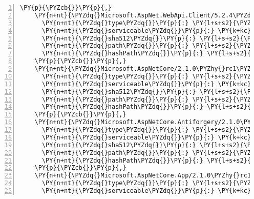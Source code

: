 \begin{Verbatim}[commandchars=\\\{\},numbers=left,firstnumber=1,stepnumber=1,numberblanklines=0]
    \PY{p}{\PYZcb{}}\PY{p}{,}
    \PY{n+nt}{\PYZdq{}Microsoft.AspNet.WebApi.Client/5.2.4\PYZdq{}}\PY{p}{:} \PY{p}{\PYZob{}}
      \PY{n+nt}{\PYZdq{}type\PYZdq{}}\PY{p}{:} \PY{l+s+s2}{\PYZdq{}package\PYZdq{}}\PY{p}{,}
      \PY{n+nt}{\PYZdq{}serviceable\PYZdq{}}\PY{p}{:} \PY{k+kc}{true}\PY{p}{,}
      \PY{n+nt}{\PYZdq{}sha512\PYZdq{}}\PY{p}{:} \PY{l+s+s2}{\PYZdq{}sha512\PYZhy{}OdBVC2bQWkf9qDd7Mt07ev4SwIdu6VmLBMTWC0D5cOP/HWSXyv/77otwtXVrAo42duNjvXOjzjP5oOI9m1+DTQ==\PYZdq{}}\PY{p}{,}
      \PY{n+nt}{\PYZdq{}path\PYZdq{}}\PY{p}{:} \PY{l+s+s2}{\PYZdq{}microsoft.aspnet.webapi.client/5.2.4\PYZdq{}}\PY{p}{,}
      \PY{n+nt}{\PYZdq{}hashPath\PYZdq{}}\PY{p}{:} \PY{l+s+s2}{\PYZdq{}microsoft.aspnet.webapi.client.5.2.4.nupkg.sha512\PYZdq{}}
    \PY{p}{\PYZcb{}}\PY{p}{,}
    \PY{n+nt}{\PYZdq{}Microsoft.AspNetCore/2.1.0\PYZhy{}rc1\PYZhy{}final\PYZdq{}}\PY{p}{:} \PY{p}{\PYZob{}}
      \PY{n+nt}{\PYZdq{}type\PYZdq{}}\PY{p}{:} \PY{l+s+s2}{\PYZdq{}package\PYZdq{}}\PY{p}{,}
      \PY{n+nt}{\PYZdq{}serviceable\PYZdq{}}\PY{p}{:} \PY{k+kc}{true}\PY{p}{,}
      \PY{n+nt}{\PYZdq{}sha512\PYZdq{}}\PY{p}{:} \PY{l+s+s2}{\PYZdq{}sha512\PYZhy{}5T8MhF9HJ1WXZXncUUN61WUXhsjr5AQz2XYdPShYJgXF8S3qh+ymvd3WVAZW3ITYpi3arul4sxdvNy11xusD3w==\PYZdq{}}\PY{p}{,}
      \PY{n+nt}{\PYZdq{}path\PYZdq{}}\PY{p}{:} \PY{l+s+s2}{\PYZdq{}microsoft.aspnetcore/2.1.0\PYZhy{}rc1\PYZhy{}final\PYZdq{}}\PY{p}{,}
      \PY{n+nt}{\PYZdq{}hashPath\PYZdq{}}\PY{p}{:} \PY{l+s+s2}{\PYZdq{}microsoft.aspnetcore.2.1.0\PYZhy{}rc1\PYZhy{}final.nupkg.sha512\PYZdq{}}
    \PY{p}{\PYZcb{}}\PY{p}{,}
    \PY{n+nt}{\PYZdq{}Microsoft.AspNetCore.Antiforgery/2.1.0\PYZhy{}rc1\PYZhy{}final\PYZdq{}}\PY{p}{:} \PY{p}{\PYZob{}}
      \PY{n+nt}{\PYZdq{}type\PYZdq{}}\PY{p}{:} \PY{l+s+s2}{\PYZdq{}package\PYZdq{}}\PY{p}{,}
      \PY{n+nt}{\PYZdq{}serviceable\PYZdq{}}\PY{p}{:} \PY{k+kc}{true}\PY{p}{,}
      \PY{n+nt}{\PYZdq{}sha512\PYZdq{}}\PY{p}{:} \PY{l+s+s2}{\PYZdq{}sha512\PYZhy{}W6jhQ0FZkeQB6UuL5fQz7ToQcWwvK1sVux2LIPRswD98RBxpi8GInSGhgUBVy7TwPNXMWja9GyliueizZTMWag==\PYZdq{}}\PY{p}{,}
      \PY{n+nt}{\PYZdq{}path\PYZdq{}}\PY{p}{:} \PY{l+s+s2}{\PYZdq{}microsoft.aspnetcore.antiforgery/2.1.0\PYZhy{}rc1\PYZhy{}final\PYZdq{}}\PY{p}{,}
      \PY{n+nt}{\PYZdq{}hashPath\PYZdq{}}\PY{p}{:} \PY{l+s+s2}{\PYZdq{}microsoft.aspnetcore.antiforgery.2.1.0\PYZhy{}rc1\PYZhy{}final.nupkg.sha512\PYZdq{}}
    \PY{p}{\PYZcb{}}\PY{p}{,}
    \PY{n+nt}{\PYZdq{}Microsoft.AspNetCore.App/2.1.0\PYZhy{}rc1\PYZhy{}final\PYZdq{}}\PY{p}{:} \PY{p}{\PYZob{}}
      \PY{n+nt}{\PYZdq{}type\PYZdq{}}\PY{p}{:} \PY{l+s+s2}{\PYZdq{}package\PYZdq{}}\PY{p}{,}
      \PY{n+nt}{\PYZdq{}serviceable\PYZdq{}}\PY{p}{:} \PY{k+kc}{true}\PY{p}{,}

\end{Verbatim}
